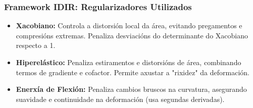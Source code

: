 \documentclass[xcolor=dvipsnames]{beamer}
\begin{document}
\begin{frame}
\frametitle{Framework IDIR: Regularizadores Utilizados}

\begin{itemize}
    \item \textbf{Xacobiano:} Controla a distorsión local da área, evitando pregamentos e compresións extremas. Penaliza desviacións do determinante do Xacobiano respecto a 1.
    \item \textbf{Hiperelástico:} Penaliza estiramentos e distorsións de área, combinando termos de gradiente e cofactor. Permite axustar a "rixidez" da deformación.
    \item \textbf{Enerxía de Flexión:} Penaliza cambios bruscos na curvatura, asegurando suavidade e continuidade na deformación (usa segundas derivadas).
\end{itemize}

\vspace{0.2cm}
\centering
\small

\vspace{0.2cm}
\end{frame}
\end{document}

